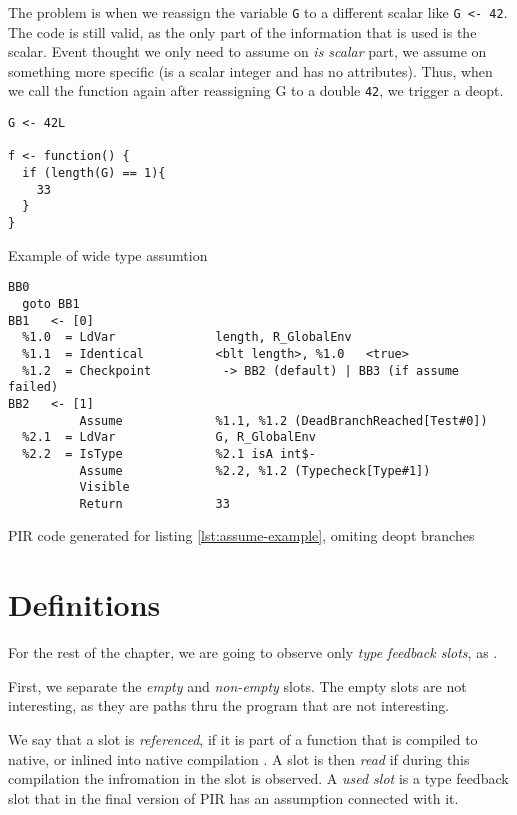 The problem is when we reassign the variable \texttt{G} to a different scalar like \texttt{G <- 42}. The code is still valid, as the only part of the information that is used is the scalar. Event thought we only need to assume on \textit{is scalar} part, we assume on something more specific (is a scalar integer and has no attributes). Thus, when we call the function again after reassigning G to a double \texttt{42}, we trigger a deopt.

\begin{listing}
	\begin{verbatim}
G <- 42L

f <- function() {
  if (length(G) == 1){
    33
  }
}
  \end{verbatim}
	\caption{Example of wide type assumtion}\label{lst:assume-example}
\end{listing}

\begin{listing}
	\begin{verbatim}
BB0
  goto BB1
BB1   <- [0]
  %1.0  = LdVar              length, R_GlobalEnv
  %1.1  = Identical          <blt length>, %1.0   <true>
  %1.2  = Checkpoint          -> BB2 (default) | BB3 (if assume failed)
BB2   <- [1]
          Assume             %1.1, %1.2 (DeadBranchReached[Test#0])
  %2.1  = LdVar              G, R_GlobalEnv
  %2.2  = IsType             %2.1 isA int$-
          Assume             %2.2, %1.2 (Typecheck[Type#1])
          Visible
          Return             33
  \end{verbatim}
	\caption{PIR code generated for listing \ref{lst:assume-example}, omiting deopt branches}\label{lst:assume-example-pir}
\end{listing}

\section{Definitions}

For the rest of the chapter, we are going to observe only \textit{type feedback slots}, as .

First, we separate the \textit{empty} and \textit{non-empty} slots. The empty slots are not interesting, as they are paths thru the program that are not interesting.

We say that a slot is \textit{referenced}, if it is part of a function that is compiled to native, or inlined into native compilation . A slot is then \textit{read} if during this compilation the infromation in the slot is observed. A \textit{used slot} is a type feedback slot that in the final version of PIR has an assumption connected with it.

